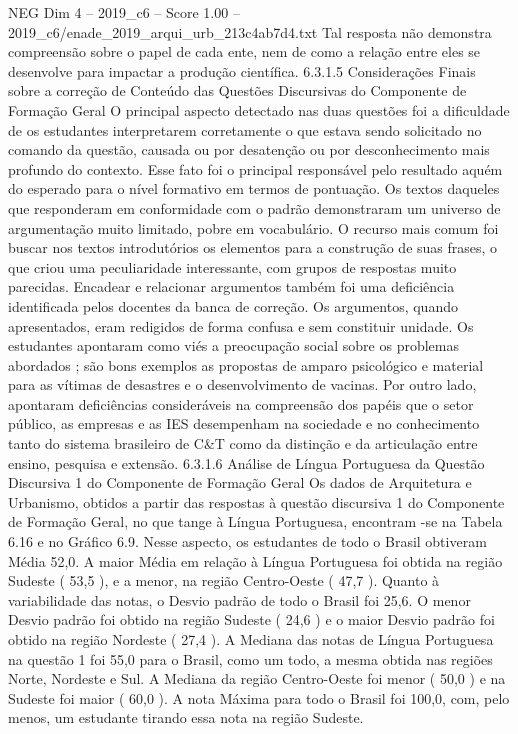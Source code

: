 \begin{textsample}{NEG Dim 4 – 2019\_c6 – Score 1.00 – 2019\_c6/enade\_2019\_arqui\_urb\_213c4ab7d4.txt}
Tal resposta não demonstra compreensão sobre o papel de cada ente, nem de como a relação entre eles se desenvolve para impactar a produção científica. 6.3.1.5 Considerações Finais sobre a correção de Conteúdo das Questões Discursivas do Componente de Formação Geral O principal aspecto detectado nas duas questões foi a dificuldade de os estudantes interpretarem corretamente o que estava sendo solicitado no comando da questão, causada ou por desatenção ou por desconhecimento mais profundo do contexto.
Esse fato foi o principal responsável pelo resultado aquém do esperado para o nível formativo em termos de pontuação.
Os textos daqueles que responderam em conformidade com o padrão demonstraram um universo de argumentação muito limitado, pobre em vocabulário.
O recurso mais comum foi buscar nos textos introdutórios os elementos para a construção de suas frases, o que criou uma peculiaridade interessante, com grupos de respostas muito parecidas.
Encadear e relacionar argumentos também foi uma deficiência identificada pelos docentes da banca de correção.
Os argumentos, quando apresentados, eram redigidos de forma confusa e sem constituir unidade.
Os estudantes apontaram como viés a preocupação social sobre os problemas abordados ; são bons exemplos as propostas de amparo psicológico e material para as vítimas de desastres e o desenvolvimento de vacinas.
Por outro lado, apontaram deficiências consideráveis na compreensão dos papéis que o setor público, as empresas e as IES desempenham na sociedade e no conhecimento tanto do sistema brasileiro de C\&T como da distinção e da articulação entre ensino, pesquisa e extensão. 6.3.1.6 Análise de Língua Portuguesa da Questão Discursiva 1 do Componente de Formação Geral Os dados de Arquitetura e Urbanismo, obtidos a partir das respostas à questão discursiva 1 do Componente de Formação Geral, no que tange à Língua Portuguesa, encontram -se na Tabela 6.16 e no Gráfico 6.9.
Nesse aspecto, os estudantes de todo o Brasil obtiveram Média 52,0.
A maior Média em relação à Língua Portuguesa foi obtida na região Sudeste ( 53,5 ), e a menor, na região Centro-Oeste ( 47,7 ).
Quanto à variabilidade das notas, o Desvio padrão de todo o Brasil foi 25,6.
O menor Desvio padrão foi obtido na região Sudeste ( 24,6 ) e o maior Desvio padrão foi obtido na região Nordeste ( 27,4 ).
A Mediana das notas de Língua Portuguesa na questão 1 foi 55,0 para o Brasil, como um todo, a mesma obtida nas regiões Norte, Nordeste e Sul.
A Mediana da região Centro-Oeste foi menor ( 50,0 ) e na Sudeste foi maior ( 60,0 ).
A nota Máxima para todo o Brasil foi 100,0, com, pelo menos, um estudante tirando essa nota na região Sudeste.

\end{textsample}
